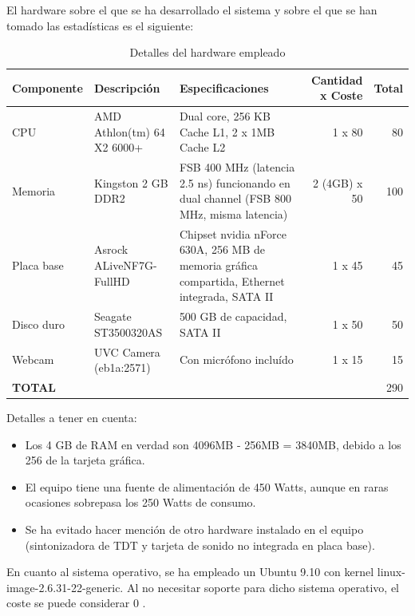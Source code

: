 El hardware sobre el que se ha desarrollado el sistema y sobre el que se han tomado las estadísticas es el siguiente:

\begin{table}[!htb]
	\begin{tabular}{|l|p{3cm}|p{4cm}|r|r|}
		\hline
		Componente & Descripción & Especificaciones & Cantidad x Coste & Total \\
		\hline
		CPU & AMD Athlon(tm) 64 X2 6000+ & Dual core, 256 KB Cache L1,  2 x 1MB Cache L2 & 1 x 80 \eup & 80 \eup\\
		\hline
		Memoria & Kingston 2 GB DDR2 & FSB 400 MHz (latencia 2.5 ns) funcionando en dual channel (FSB 800 MHz, misma latencia) & 2 (4GB) x 50 \eup & 100 \eup \\
		\hline
		Placa base & Asrock ALiveNF7G-FullHD & Chipset nvidia nForce 630A, 256 MB de memoria gráfica compartida, Ethernet integrada, SATA II & 1 x 45 \eup & 45 \eup \\
		\hline
		Disco duro & Seagate ST3500320AS & 500 GB de capacidad, SATA II & 1 x 50 \eup & 50 \eup \\
		\hline
		Webcam & UVC Camera (eb1a:2571) & Con micrófono incluído & 1 x 15 \eup & 15 \eup \\
		\hline
		\textbf{TOTAL} & & & &  290 \eup \\
		\hline
	\end{tabular}
	\caption{Detalles del hardware empleado}
	\label{tab:hardware_details}
\end{table}

Detalles a tener en cuenta:
\begin{itemize}
	\item{Los 4 GB de RAM en verdad son 4096MB - 256MB = 3840MB, debido a los 256 de la tarjeta gráfica.}
	\item{El equipo tiene una fuente de alimentación de 450 Watts, aunque en raras ocasiones sobrepasa los 250 Watts de consumo.}
	\item{Se ha evitado hacer mención de otro hardware instalado en el equipo (sintonizadora de TDT y tarjeta de sonido no integrada en placa base).}
\end{itemize}

En cuanto al sistema operativo, se ha empleado un Ubuntu 9.10 con kernel linux-image-2.6.31-22-generic. Al no necesitar soporte para dicho sistema operativo, el coste se puede considerar 0 \eup.
